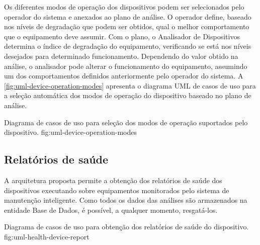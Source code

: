 Os diferentes modos de operação dos dispositivos podem ser selecionados pelo operador do sistema e
anexados ao plano de análise. O operador define, baseado nos níveis de degradação que podem ser
obtidos, qual o melhor comportamento que o equipamento deve assumir. Com o plano, o Analisador de
Dispositivos determina o índice de degradação do equipamento, verificando se está nos níveis
desejados para determinado funcionamento. Dependendo do valor obtido na análise, o analisador pode
alterar o funcionamento do equipamento, assumindo um dos comportamentos definidos anteriormente pelo
operador do sistema. A \cref{fig:uml-device-operation-modes} apresenta o diagrama \gls{UML} de casos
de uso para a seleção automática dos modos de operação do dispositivo baseado no plano de análise.

  {Diagrama de casos de uso para seleção dos modos de operação suportados pelo dispositivo.}
  {fig:uml-device-operation-modes}


\subsection{Relatórios de saúde}

A arquitetura proposta permite a obtenção dos relatórios de saúde dos dispositivos executando sobre
equipamentos monitorados pelo sistema de manutenção inteligente. Como todos os dados das análises
são armazenados na entidade Base de Dados, é possível, a qualquer momento, resgatá-los.

  {Diagrama de casos de uso para obtenção dos relatórios de saúde do dispositivo.}
  {fig:uml-health-device-report}
